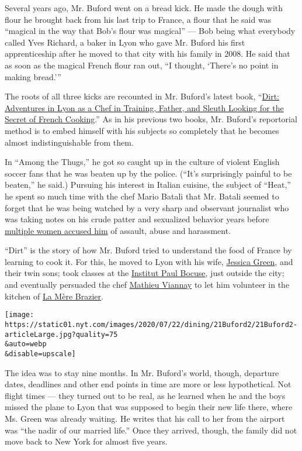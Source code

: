 Several years ago, Mr. Buford went on a bread kick. He made the dough
with flour he brought back from his last trip to France, a flour that he
said was ``magical in the way that Bob's flour was magical'' --- Bob
being what everybody called Yves Richard, a baker in Lyon who gave Mr.
Buford his first apprenticeship after he moved to that city with his
family in 2008. He said that as soon as the magical French flour ran
out, ``I thought, `There's no point in making bread.'''

The roots of all three kicks are recounted in Mr. Buford's latest book,
``\href{https://www.nytimes.com/2020/05/25/books/review-dirt-bill-buford.html?searchResultPosition=1}{Dirt:
Adventures in Lyon as a Chef in Training, Father, and Sleuth Looking for
the Secret of French Cooking}.'' As in his previous two books, Mr.
Buford's reportorial method is to embed himself with his subjects so
completely that he becomes almost indistinguishable from them.

In ``Among the Thugs,'' he got so caught up in the culture of violent
English soccer fans that he was beaten up by the police. (``It's
surprisingly painful to be beaten,'' he said.) Pursuing his interest in
Italian cuisine, the subject of ``Heat,'' he spent so much time with the
chef Mario Batali that Mr. Batali seemed to forget that he was being
watched by a very sharp and observant journalist who was taking notes on
his crude patter and sexualized behavior years before
\href{https://www.nytimes.com/2019/03/06/dining/mario-batali-bastianich-restaurants.html}{multiple
women accused him} of assault, abuse and harassment.

``Dirt'' is the story of how Mr. Buford tried to understand the food of
France by learning to cook it. For this, he moved to Lyon with his wife,
\href{https://twitter.com/jessicahgreen}{Jessica Green}, and their twin
sons; took classes at the
\href{https://en.institutpaulbocuse.com/}{Institut Paul Bocuse}, just
outside the city; and eventually persuaded the chef
\href{https://www.instagram.com/mathieuviannay/}{Mathieu Viannay} to let
him volunteer in the kitchen of \href{https://lamerebrazier.fr/en/}{La
Mère Brazier}.

\texttt{[image: https://static01.nyt.com/images/2020/07/22/dining/21Buford2/21Buford2-articleLarge.jpg?quality=75\\\&auto=webp\\\&disable=upscale]}

The idea was to stay nine months. In Mr. Buford's world, though,
departure dates, deadlines and other end points in time are more or less
hypothetical. Not flight times --- they turned out to be real, as he
learned when he and the boys missed the plane to Lyon that was supposed
to begin their new life there, where Ms. Green was already waiting. He
writes that his call to her from the airport was ``the nadir of our
married life.'' Once they arrived, though, the family did not move back
to New York for almost five years.

